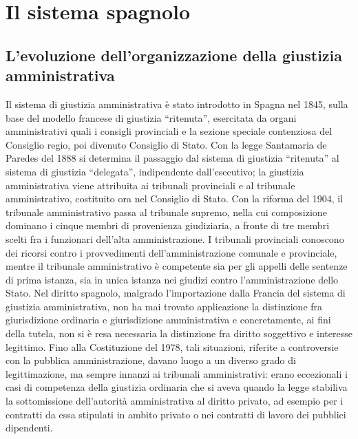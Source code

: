 \documentclass[12pt,it,a4paper,]{report}
\begin{document}
\hypertarget{il-sistema-spagnolo}{%
\chapter{Il sistema spagnolo}\label{il-sistema-spagnolo}}

\hypertarget{levoluzione-dellorganizzazione-della-giustizia-amministrativa}{%
\section{L'evoluzione dell'organizzazione della giustizia
amministrativa}\label{levoluzione-dellorganizzazione-della-giustizia-amministrativa}}

Il sistema di giustizia amministrativa è stato introdotto in Spagna nel
1845, sulla base del modello francese di giustizia ``ritenuta'',
esercitata da organi amministrativi quali i consigli provinciali e la
sezione speciale contenziosa del Consiglio regio, poi divenuto Consiglio
di Stato. Con la legge Santamaria de Paredes del 1888 si determina il
passaggio dal sistema di giustizia ``ritenuta'' al sistema di giustizia
``delegata'', indipendente dall'esecutivo; la giustizia amministrativa
viene attribuita ai tribunali provinciali e al tribunale amministrativo,
costituito ora nel Consiglio di Stato. Con la riforma del 1904, il
tribunale amministrativo passa al tribunale supremo, nella cui
composizione dominano i cinque membri di provenienza giudiziaria, a
fronte di tre membri scelti fra i funzionari dell'alta amministrazione.
I tribunali provinciali conoscono dei ricorsi contro i provvedimenti
dell'amministrazione comunale e provinciale, mentre il tribunale
amministrativo è competente sia per gli appelli delle sentenze di prima
istanza, sia in unica istanza nei giudizi contro l'amministrazione dello
Stato. Nel diritto spagnolo, malgrado l'importazione dalla Francia del
sistema di giustizia amministrativa, non ha mai trovato applicazione la
distinzione fra giurisdizione ordinaria e giurisdizione amministrativa e
concretamente, ai fini della tutela, non si è resa necessaria la
distinzione fra diritto soggettivo e interesse legittimo. Fino alla
Costituzione del 1978, tali situazioni, riferite a controversie con la
pubblica amministrazione, davano luogo a un diverso grado di
legittimazione, ma sempre innanzi ai tribunali amministrativi: erano
eccezionali i casi di competenza della giustizia ordinaria che si aveva
quando la legge stabiliva la sottomissione dell'autorità amministrativa
al diritto privato, ad esempio per i contratti da essa stipulati in
ambito privato o nei contratti di lavoro dei pubblici dipendenti.
\end{document}
